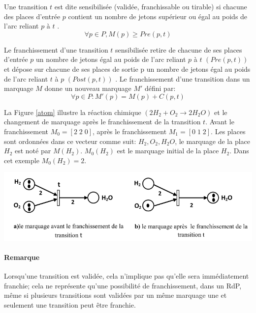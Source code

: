 \begin{definition}
Une transition $t$ est dite sensibilisée (validée, franchissable ou tirable) si chacune des places d'entrée $p$ contient un nombre de jetons supérieur ou égal au poids de l'arc reliant $p$ à $t$ \citep{SaidounicoursRdp2017}.  
$$ \forall p \in P, M(p) \geq  Pre (p, t) $$
\end{definition}

\begin{definition}
Le franchissement d'une transition $t$ sensibilisée retire de chacune de ses places d'entrée $p$ un nombre de jetons égal au poids de l'arc reliant $p$ à $t$ $(Pre (p, t))$ et dépose sur chacune de ses places de sortie p un nombre de jetons égal au poids de l'arc reliant $t$ à $p$ $(Post (p, t))$ \citep{SaidounicoursRdp2017}. Le franchissement d'une transition dans un marquage $M$ donne un nouveau marquage $M'$ défini par:
$$ \forall p \in P : M'(p)= M(p)+ C(p,t) $$

La Figure \ref{atom} illustre la réaction chimique $(2H_{2} + O_{2} \rightarrow 2H_{2}O)$ et le changement de marquage après le franchissement de la transition $t$. Avant le franchissement $M_ 0 =[2\; 2\; 0]$, après le franchissement $M_1 =[0\; 1\; 2]$. Les places sont ordonnées dans ce vecteur comme suit: $H_2 , O_2 , H_2 O$, le marquage de la place $H_2$ est noté par $M(H_2 )$. $M_0 (H_2 )$ est le marquage initial de la place $H_2$. Dans cet exemple $M_0 (H_2 ) =2$. 

\begin{center}
	\includegraphics[scale=0.5]{img/H2O.PNG}
	 \label{atom}
 \end{center}
\end{definition}\paragraph{Remarque }
 Lorsqu'une transition est validée, cela n'implique pas qu'elle sera immédiatement franchie; cela ne représente qu'une possibilité de franchissement, dans un  RdP, même si plusieurs transitions sont validées par un même marquage une et seulement une transition peut être franchie.
 
